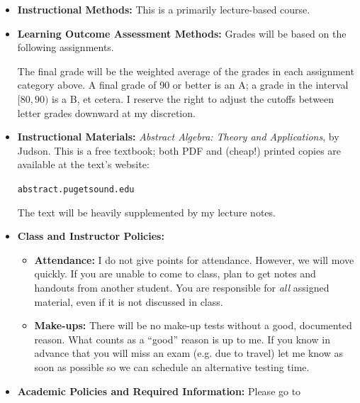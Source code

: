 \documentclass{article}
\begin{document}
\begin{itemize}
\item \textbf{Instructional Methods:} This is a primarily lecture-based course.


\item \textbf{Learning Outcome Assessment Methods:} Grades will be based on the following assignments.

The final grade will be the weighted average of the grades in each assignment category above. A final grade of 90 or better is an A; a grade in the interval $[80,90)$ is a B, et cetera. I reserve the right to adjust the cutoffs between letter grades downward at my discretion.


\item \textbf{Instructional Materials:} \emph{Abstract Algebra: Theory and Applications}, by Judson. This is a free textbook; both PDF and (cheap!) printed copies are available at the text's website:
\begin{center}
\texttt{abstract.pugetsound.edu}
\end{center}
The text will be heavily supplemented by my lecture notes.


\item \textbf{Class and Instructor Policies:}
\begin{itemize}
\item \textbf{Attendance:} I do not give points for attendance. However, we will move quickly. If you are unable to come to class, plan to get notes and handouts from another student. You are responsible for \emph{all} assigned material, even if it is not discussed in class.

\item \textbf{Make-ups:} There will be no make-up tests without a good, documented reason. What counts as a ``good'' reason is up to me. If you know in advance that you will miss an exam (e.g. due to travel) let me know as soon as possible so we can schedule an alternative testing time.
\end{itemize}


\item \textbf{Academic Policies and Required Information:} Please go to 


\end{itemize}
\end{document}
